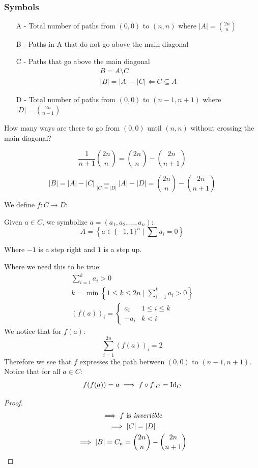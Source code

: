 \documentclass[00_complete]{subfiles}
\begin{document}
\subsubsection{Symbols}
\begin{itemize}
    \item[A -] Total number of paths from $(0,0)$ to $(n,n)$ where $|A| = \binom{2n}{n}$
    \item[B -] Paths in A that do not go above the main diagonal
    \item[C -] Paths that go above the main diagonal
    \begin{gather*}
        B = A \setminus C \\
        |B| = |A| - |C| \Leftarrow C \subseteq A
    \end{gather*}
    \item[D -]Total number of paths from $(0,0)$ to $(n-1,n+1)$ where $|D|=\binom{2n}{n-1}$
\end{itemize}
\begin{claim}
How many ways are there to go from $(0,0)$ until $(n,n)$ without crossing the
main diagonal?

$$\frac{1}{n+1} \binom{2n}{n} = \binom{2n}{n} - \binom{2n}{n+1}$$
\end{claim}

$$|B| = |A| - |C| \underset{|C|=|D|}{=} |A| - |D| = \binom{2n}{n}-\binom{2n}{n+1}$$

We define $f: C \to D$:

Given $a \in C$, we symbolize $a=(a_1,a_2,\dots,a_n)$:
$$A = \left\{a \in \{-1,1\}^n \mid \sum a_i = 0 \right\}$$

Where $-1$ is a step right and $1$ is a step up.

Where we need this to be true:
\begin{gather*}
\sum_{i=1}^{k}a_i>0 \\
k=\min\left\{1 \leq k\leq 2n \mid \sum_{i=1}^{k}a_i>0\right\} \\
(f(a))_i = \begin{cases}
    a_i & 1 \leq i \leq k \\
    -a_i & k < i
\end{cases}
\end{gather*}
We notice that for $f(a)$:
$$\sum_{i=1}^{2n}(f(a))_i = 2$$
Therefore we see that $f$ expresses the path between $(0,0)$ to $(n-1,n+1)$.
Notice that for  all $a \in C$:
$$f(f(a))=a \implies f \circ f |_C = \operatorname{Id}_C$$
\begin{proof}
\begin{gather*}
    \implies f \text{ is \emph{invertible}} \\
    \implies |C| = |D| \\
    \implies |B| = C_n = \binom{2n}{n} - \binom{2n}{n+1}
\end{gather*}
\end{proof}
\end{document}
